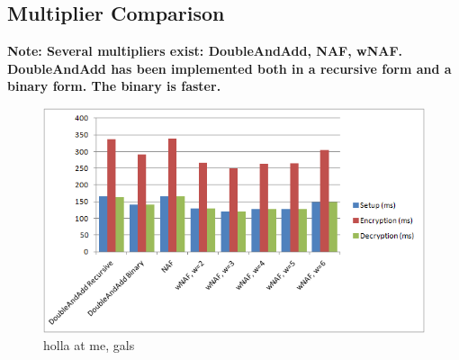 \subsection{Multiplier Comparison}

\textbf{Note: Several multipliers exist: DoubleAndAdd, NAF, wNAF. DoubleAndAdd has been implemented both in a recursive form
and a binary form. The binary is faster.}

\begin{figure}[htb!]
	\centering
	\includegraphics[width=\textwidth]{performance/multipliers-comparison}
	\caption{holla at me, gals}
	\label{fig:multipliers-comparison}
\end{figure}